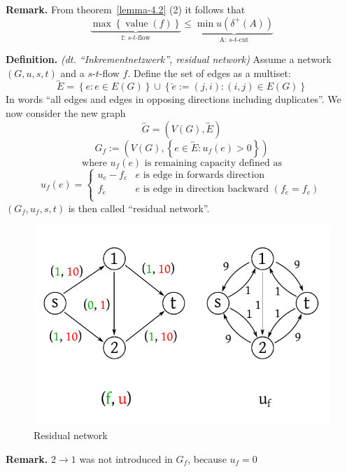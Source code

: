 \documentclass[a4paper]{article}
\theoremstyle{definition}
\newcommand{\set}[1]{\left\{#1\right\}}
\newcommand{\flow}[2]{$#1$-$#2$-flow}
\begin{document}
\textbf{Remark.}
  From theorem~\ref{lemma-4.2} (2) it follows that
  \[
    \underbrace{\max\set{\operatorname{value}(f)}}_{\text{f: \flow st}} \leq
    \underbrace{\min{u(\delta^+(A))}}_{\text{A: $s$-$t$-cut}}
  \]

\textbf{Definition.} \emph{(dt. ``Inkrementnetzwerk'', residual network)}
  Assume a network $(G, u, s, t)$ and a \flow st $f$. Define the set of edges as a multiset:
  \[
    \overleftrightarrow E = \set{e: e \in E(G)} \cup \set{\overleftarrow e := (j, i): (i, j) \in E(G)}
  \]
  In words ``all edges and edges in opposing directions including duplicates''.
  We now consider the new graph
  \[
    \overleftrightarrow G = (V(G), \overleftrightarrow E)
  \] \[
    G_f := (V(G), \set{e \in \overleftrightarrow E: u_f(e) > 0})
  \] \[
      \text{ where } u_f(e) \text{ is remaining capacity defined as }
  \] \[
      u_f(e) = \left\{\begin{array}{lc}
        u_e - f_e & e \text{ is edge in forwards direction} \\
        f_{\overleftarrow e} & e \text{ is edge in direction backward } (f_{\overleftarrow e} = f_e) \\
      \end{array}\right.
  \]
  $(G_f, u_f, s, t)$ is then called ``residual network''.

\begin{figure}[ht]
 \begin{center}
  \includegraphics{img/residual_graph.pdf}
  \caption{Residual network}
 \end{center}
\end{figure}

\textbf{Remark.} $2\rightarrow 1$ was not introduced in $G_f$, because $u_f = 0$
\end{document}
